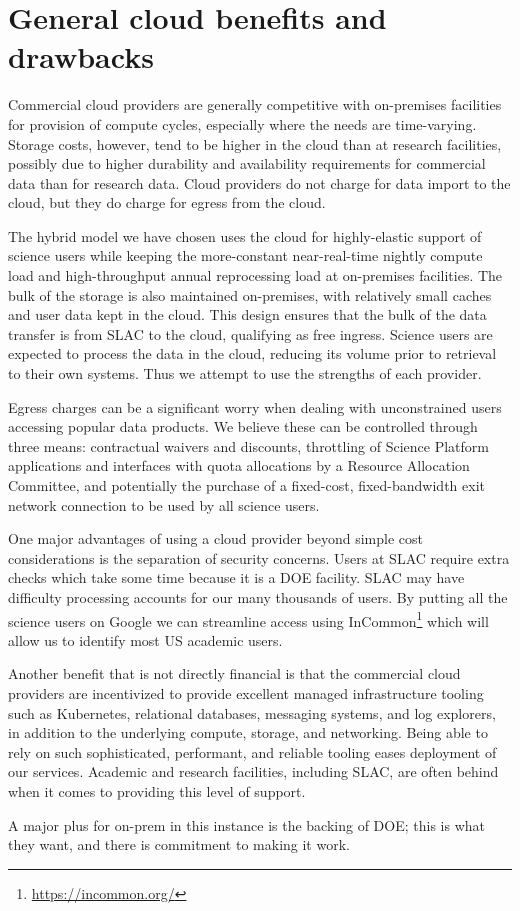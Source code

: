 \section{General cloud benefits and drawbacks} \label{sec:tradeoffs}

Commercial cloud providers are generally competitive with on-premises facilities for provision of compute cycles, especially where the needs are time-varying.
Storage costs, however, tend to be higher in the cloud than at research facilities, possibly due to higher durability and availability requirements for commercial data than for research data.
Cloud providers do not charge for data import to the cloud, but they do charge for egress from the cloud.

The hybrid model we have chosen uses the cloud for highly-elastic support of science users while keeping the more-constant near-real-time nightly compute load and high-throughput annual reprocessing load at on-premises facilities.
The bulk of the storage is also maintained on-premises, with relatively small caches and user data kept in the cloud.
This design ensures that the bulk of the data transfer is from SLAC to the cloud, qualifying as free ingress.
Science users are expected to process the data in the cloud, reducing its volume prior to retrieval to their own systems.
Thus we attempt to use the strengths of each provider.

Egress charges can be a significant worry when dealing with unconstrained users accessing popular data products.
We believe these can be controlled through three means: contractual waivers and discounts, throttling of Science Platform applications and interfaces with quota allocations by a Resource Allocation Committee, and potentially the purchase of a fixed-cost, fixed-bandwidth exit network connection to be used by all science users.

One major advantages of using a cloud provider beyond simple cost considerations is the separation of security concerns.
Users at SLAC require extra checks which take some time because it is a DOE facility.
SLAC may have difficulty processing accounts for our many thousands of users.
By putting all the science users on Google we can streamline access using InCommon\footnote{\url{https://incommon.org/}} which will allow us to identify most US academic users.

Another benefit that is not directly financial is that the commercial cloud providers are incentivized to provide excellent managed infrastructure tooling such as Kubernetes, relational databases, messaging systems, and log explorers, in addition to the underlying compute, storage, and networking.
Being able to rely on such sophisticated, performant, and reliable tooling eases deployment of our services.
Academic and research facilities, including SLAC, are often behind when it comes to providing this level of support.

A major plus for on-prem in this instance is the backing of DOE; this is what they want, and there is commitment to making it work.

